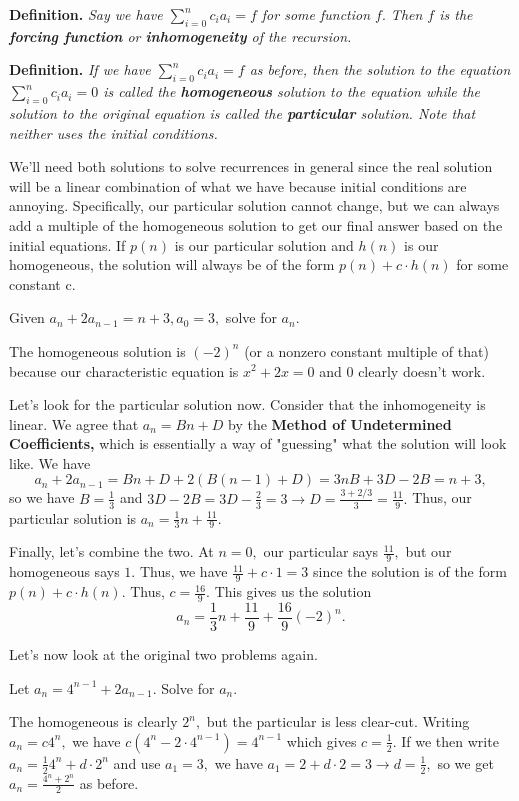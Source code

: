 \documentclass[11pt,twosided]{article}
\begin{document}
\textbf{Definition.} \textit{Say we have $\sum_{i=0}^{n}c_ia_i=f$ for some function $f.$ Then $f$ is the \textbf{forcing function} or \textbf{inhomogeneity} of the recursion.}

\textbf{Definition.} \textit{If we have $\sum_{i=0}^{n}c_ia_i=f$ as before, then the solution to the equation $\sum_{i=0}^{n}c_ia_i=0$ is called the \textbf{homogeneous} solution to the equation while the solution to the original equation is called the \textbf{particular} solution. Note that neither uses the initial conditions.}

We'll need both solutions to solve recurrences in general since the real solution will be a linear combination of what we have because initial conditions are annoying. Specifically, our particular solution cannot change, but we can always add a multiple of the homogeneous solution to get our final answer based on the initial equations. If $p(n)$ is our particular solution and $h(n)$ is our homogeneous, the solution will always be of the form $p(n)+c\cdot h(n)$ for some constant c.

 Given $a_n+2a_{n-1}=n+3, a_0=3,$ solve for $a_n.$

\solution The homogeneous solution is $(-2)^n$ (or a nonzero constant multiple of that) because our characteristic equation is $x^2+2x=0$ and $0$ clearly doesn't work.

Let's look for the particular solution now. Consider that the inhomogeneity is linear. We agree that $a_n=Bn+D$ by the \textbf{Method of Undetermined Coefficients,} which is essentially a way of "guessing" what the solution will look like. We have $$a_n+2a_{n-1}=Bn+D+2(B(n-1)+D)=3nB+3D-2B=n+3,$$ so we have $B=\frac{1}{3}$ and $3D-2B=3D-\frac{2}{3}=3\rightarrow D=\frac{3+2/3}{3}=\frac{11}{9}.$ Thus, our particular solution is $a_n=\frac{1}{3}n+\frac{11}{9}$.

Finally, let's combine the two. At $n=0,$ our particular says $\frac{11}{9},$ but our homogeneous says $1.$ Thus, we have $\frac{11}{9}+c\cdot 1=3$ since the solution is of the form $p(n)+c\cdot h(n).$ Thus, $c=\frac{16}{9}.$ This gives us the solution
$$a_n=\boxed{\frac{1}{3}n+\frac{11}{9}+\frac{16}{9}(-2)^n}.$$

Let's now look at the original two problems again.

 Let $a_n=4^{n-1}+2a_{n-1}.$ Solve for $a_n.$

\solution The homogeneous is clearly $2^n,$ but the particular is less clear-cut. Writing $a_n=c4^n,$ we have $c(4^n-2\cdot 4^{n-1})=4^{n-1}$ which gives $c=\frac{1}{2}.$ If we then write $a_n=\frac{1}{2}4^n+d\cdot 2^n$ and use $a_1=3,$ we have $a_1=2+d\cdot 2=3\rightarrow d=\frac{1}{2},$ so we get $a_n=\frac{4^n+2^n}{2}$ as before.
\end{document}
